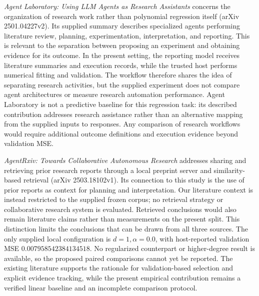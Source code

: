 \documentclass[11pt]{article}
\begin{document}
\emph{Agent Laboratory: Using LLM Agents as Research Assistants} concerns the organization of research work rather than polynomial regression itself (arXiv 2501.04227v2). Its supplied summary describes specialized agents performing literature review, planning, experimentation, interpretation, and reporting. This is relevant to the separation between proposing an experiment and obtaining evidence for its outcome. In the present setting, the reporting model receives literature summaries and execution records, while the trusted host performs numerical fitting and validation. The workflow therefore shares the idea of separating research activities, but the supplied experiment does not compare agent architectures or measure research automation performance. Agent Laboratory is not a predictive baseline for this regression task: its described contribution addresses research assistance rather than an alternative mapping from the supplied inputs to responses. Any comparison of research workflows would require additional outcome definitions and execution evidence beyond validation MSE.

\emph{AgentRxiv: Towards Collaborative Autonomous Research} addresses sharing and retrieving prior research reports through a local preprint server and similarity-based retrieval (arXiv 2503.18102v1). Its connection to this study is the use of prior reports as context for planning and interpretation. Our literature context is instead restricted to the supplied frozen corpus; no retrieval strategy or collaborative research system is evaluated. Retrieved conclusions would also remain literature claims rather than measurements on the present split. This distinction limits the conclusions that can be drawn from all three sources. The only supplied local configuration is \(d=1,\alpha=0.0\), with host-reported validation MSE \(0.007958542384134518\). No regularized counterpart or higher-degree result is available, so the proposed paired comparisons cannot yet be reported. The existing literature supports the rationale for validation-based selection and explicit evidence tracking, while the present empirical contribution remains a verified linear baseline and an incomplete comparison protocol.
\end{document}
